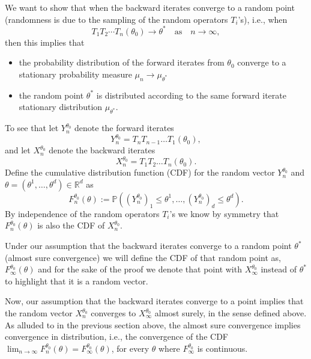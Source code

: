 \documentclass[10pt]{article} %
\renewcommand{\P}{\mathbb{P}}
\theoremstyle{plain}
\theoremstyle{definition}
\theoremstyle{remark}
\begin{document}
We want to show that when the backward iterates converge to a random point (randomness is due to the sampling of the random operators $T_i$'s), i.e., when
\[
 T_1T_2\cdots T_n(\theta_0) \longrightarrow \theta^* \quad\textrm{as}\quad n\rightarrow \infty,
\]
then this implies that
\begin{itemize}
    \item the probability distribution of the forward iterates from $\theta_0$ converge to a stationary probability measure $\mu_n \rightarrow \mu_{\theta^*}$ 
    \item the random point $\theta^*$ is distributed according to the same forward iterate stationary distribution $\mu_{\theta^*}$. 
\end{itemize} 


To see that let $Y_n^{\theta_0}$ denote the forward iterates
\begin{equation*}
    Y_n^{\theta_0} = T_nT_{n-1}\ldots T_1(\theta_0),
\end{equation*}
and let $X_n^{\theta_0}$ denote the backward iterates
\begin{equation*}
    X_n^{\theta_0} = T_1T_{2}\ldots T_n(\theta_0).
\end{equation*}
Define the cumulative distribution function (CDF) for the random vector $Y_n^{\theta_0}$ and $\theta = (\theta^1, \dots, \theta^d) \in \mathbb{R}^d$ as
\begin{equation*}
    F_n^{\theta_0}(\theta) := \P((Y_n^{\theta_0})_1 \leq \theta^1,\ldots,(Y_n^{\theta_0})_d \leq \theta^d).
\end{equation*}
By independence of the random operators $T_i$'s we know by symmetry that $F_n^{\theta_0}(\theta)$ is also the CDF of $X_n^{\theta_0}$.

Under our assumption that the backward iterates converge to a random point $\theta^*$ (almost sure convergence) we will define the CDF of that random point as, $F_\infty^{\theta_0}(\theta)$ and for the sake of the proof we denote that point with $X_\infty^{\theta_0}$ instead of $\theta^*$ to highlight that it is a random vector.

Now, our assumption that the backward iterates converge to a point implies that the random vector $X_n^{\theta_0}$ converges to $X_\infty^{\theta_0}$ almost surely, in the sense defined above. As alluded to in the previous section above, the almost sure convergence implies convergence in distribution, i.e., the convergence of the CDF $\lim_{n \to \infty} F_n^{\theta_0}(\theta) = F_\infty^{\theta_0}(\theta)$, for every $\theta$ where $F_\infty^{\theta_0}$ is continuous.
\end{document}
